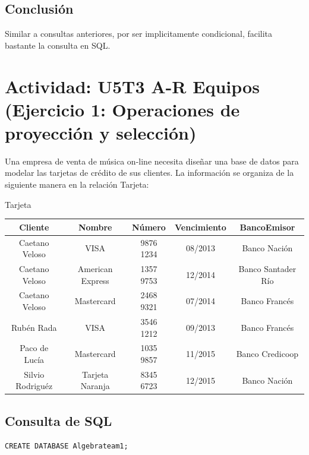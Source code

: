 \documentclass[a4paper, 12pt]{article}
\begin{document}
\begin{justify}
        \subsection{Conclusión}
        \justify
        Similar a consultas anteriores, por ser implicitamente condicional, facilita bastante la consulta en SQL.
        \section{Actividad: U5T3 A-R Equipos (Ejercicio 1: Operaciones de proyección y selección)}
        \justify
        Una empresa de venta de música on-line necesita diseñar una base de datos para modelar las tarjetas
        de crédito de sus clientes. La información se organiza de la siguiente manera en la relación Tarjeta:
        \begin{table}[H]
            Tarjeta\\
            \begin{tabular}{|c|c|c|c|c|}
            \hline
            \textbf{Cliente} & \textbf{Nombre}  & \textbf{Número} & \textbf{Vencimiento} & \textbf{BancoEmisor} \\ \hline
            Caetano Veloso   & VISA             & 9876 1234       & 08/2013              & Banco Nación         \\ \hline
            Caetano Veloso   & American Express & 1357 9753       & 12/2014              & Banco Santader Río   \\ \hline
            Caetano Veloso   & Mastercard       & 2468 9321       & 07/2014              & Banco Francés        \\ \hline
            Rubén Rada       & VISA             & 3546 1212       & 09/2013              & Banco Francés        \\ \hline
            Paco de Lucía    & Mastercard       & 1035 9857       & 11/2015              & Banco Credicoop      \\ \hline
            Silvio Rodriguéz & Tarjeta Naranja  & 8345 6723       & 12/2015              & Banco Nación         \\ \hline
            \end{tabular}
        \end{table}
        \subsection{Consulta de SQL}
\begin{verbatim}
CREATE DATABASE Algebrateam1;


\end{verbatim}
\end{justify}
\end{document}
